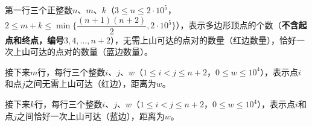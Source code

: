 第一行三个正整数$n$、$m$、$k$（$3 \le n \le 2 \cdot 10^5$，$2 \le m + k \le \min\{\dfrac{(n + 1)(n + 2)}{2}, 2 \cdot 10^5\}$），表示多边形顶点的个数（\textbf {不含起点和终点，编号$3, 4, ..., n + 2$}），无需上山可达的点对的数量（红边数量），恰好一次上山可达的点对的数量（蓝边数量）。

接下来$m$行，每行三个整数$i$、$j$、$w$（$1 \le i < j \le n + 2$，$0 \le w \le 10^4$），表示点$i$和点$j$之间无需上山可达（红边），距离为$w$。

接下来$k$行，每行三个整数$i$、$j$、$w$（$1 \le i < j \le n + 2$，$0 \le w \le 10^4$），表示点$i$和点$j$之间恰好一次上山可达（蓝边），距离为$w$。
